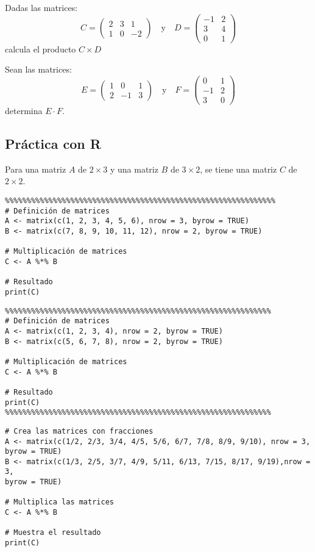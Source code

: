 \begin{exercise}
Dadas las matrices:
\[ C = \begin{pmatrix} 2 & 3 & 1 \\ 1 & 0 & -2 \end{pmatrix} \quad \text{y} \quad D = \begin{pmatrix} -1 & 2 \\ 3 & 4 \\ 0 & 1 \end{pmatrix} \]
calcula el producto \( C \times D \)    
\end{exercise}
\begin{exercise}
Sean las matrices:
\[ E = \begin{pmatrix} 1 & 0 & 1 \\ 2 & -1 & 3 \end{pmatrix} \quad \text{y} \quad F = \begin{pmatrix} 0 & 1 \\ -1 & 2 \\ 3 & 0 \end{pmatrix} \]
determina \( E \cdot F \).

\end{exercise}
\subsection{Práctica con R}
 Para una matriz $A$ de $2\times 3$ y una matriz $B$ de
$3\times2$, se tiene una matriz $C$ de $2\times2$.

\begin{verbatim}
%%%%%%%%%%%%%%%%%%%%%%%%%%%%%%%%%%%%%%%%%%%%%%%%%%%%%%%%%%%%%%
# Definición de matrices
A <- matrix(c(1, 2, 3, 4, 5, 6), nrow = 3, byrow = TRUE)
B <- matrix(c(7, 8, 9, 10, 11, 12), nrow = 2, byrow = TRUE)

# Multiplicación de matrices
C <- A %*% B

# Resultado
print(C)

\end{verbatim}

\begin{verbatim}
%%%%%%%%%%%%%%%%%%%%%%%%%%%%%%%%%%%%%%%%%%%%%%%%%%%%%%%%%%%%%
# Definición de matrices
A <- matrix(c(1, 2, 3, 4), nrow = 2, byrow = TRUE)
B <- matrix(c(5, 6, 7, 8), nrow = 2, byrow = TRUE)

# Multiplicación de matrices
C <- A %*% B

# Resultado
print(C)
%%%%%%%%%%%%%%%%%%%%%%%%%%%%%%%%%%%%%%%%%%%%%%%%%%%%%%%%%%%%%
\end{verbatim}
\begin{verbatim}
# Crea las matrices con fracciones
A <- matrix(c(1/2, 2/3, 3/4, 4/5, 5/6, 6/7, 7/8, 8/9, 9/10), nrow = 3,
byrow = TRUE)
B <- matrix(c(1/3, 2/5, 3/7, 4/9, 5/11, 6/13, 7/15, 8/17, 9/19),nrow = 3, 
byrow = TRUE)

# Multiplica las matrices
C <- A %*% B

# Muestra el resultado
print(C)    
\end{verbatim}
